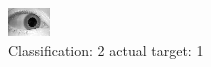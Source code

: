 \begin{figure}[h!]
\begin{center}
\includegraphics[width=0.60\columnwidth]{figures/ID1532_class_2_target_1.png}
\end{center}
\caption{ Classification: 2 actual target: 1}
\label{fig:ID1532_class_2_target_1}
\end{figure}
